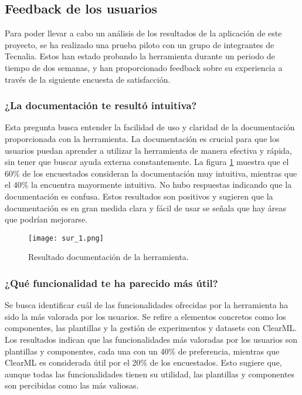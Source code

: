 \subsection{Feedback de los usuarios}
Para poder llevar a cabo un análisis de los resultados de la aplicación
de este proyecto, se ha realizado una prueba piloto con un grupo de integrantes
de Tecnalia. Estos han estado probando la herramienta durante un periodo de tiempo
de dos semanas, y han proporcionado feedback sobre su experiencia a través de
la siguiente encuesta de satisfacción.

\subsubsection{¿La documentación te resultó intuitiva?} 

Esta pregunta busca entender la facilidad de uso y claridad de la documentación proporcionada 
con la herramienta. La documentación es crucial para que los usuarios puedan 
aprender a utilizar la herramienta de manera efectiva y rápida, sin tener que 
buscar ayuda externa constantemente. La figura \ref{fig:sur_1} muestra que el 
60\% de los encuestados consideran 
la documentación muy intuitiva, mientras que el 40\% la encuentra 
mayormente intuitiva. No hubo respuestas indicando que la documentación es 
confusa. Estos resultados son positivos y sugieren que la documentación es 
en gran medida clara y fácil de usar se señala que hay áreas que podrían mejorarse. 

\begin{figure}[!h]
    \centering
    \texttt{[image: sur\_1.png]}
    \caption{Resultado documentación de la herramienta.}
    \label{fig:sur_1}
\end{figure}

\subsubsection{¿Qué funcionalidad te ha parecido más útil?} 

Se busca identificar cuál de las funcionalidades ofrecidas por la 
herramienta ha sido la más valorada por los usuarios. Se refire a 
elementos concretos como los componentes, las plantillas y la gestión de
experimentos y datasets con ClearML. 
Los resultados indican que las funcionalidades más valoradas por los usuarios son 
plantillas y componentes, cada una con un 40\% de preferencia, mientras que 
ClearML es considerada útil por el 20\% de los encuestados. Esto sugiere que, aunque todas 
las funcionalidades tienen su utilidad, las plantillas y componentes son percibidas 
como las más valiosas.

